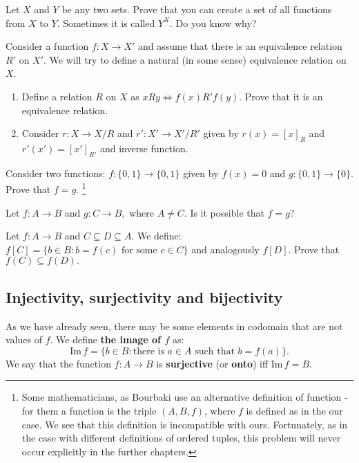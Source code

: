 \begin{exercise}
  Let $X$ and $Y$ be any two sets. Prove that you can create a set of all functions from $X$ to $Y$. Sometimes it is called $Y^X$. Do you know why?
\end{exercise}

\begin{exercise}
  Consider a function $f: X\to X'$ and assume that there is an equivalence relation $R'$ on $X'$. We will try to define a natural (in some sense) equivalence relation on $X$.
  \begin{enumerate}
    \item Define a relation $R$ on $X$ as $xRy\Leftrightarrow f(x) R' f(y)$. Prove that it is an equivalence relation.
    \item Consider $r: X\to X/R$ and $r': X'\to X'/R'$ given by $r(x)=[x]_R$ and $r'(x')=[x']_{R'}$ and inverse function.
  \end{enumerate}
\end{exercise}

\begin{prob}
	Consider two functions: $f:\{0, 1\}\to \{0,1\}$ given by $f(x)=0$ and $g:\{0,1\}\to\{0\}$.
	Prove that $f=g$.
	\footnote{Some mathematicians, as Bourbaki use an alternative definition of function - for them
	a function is the triple $(A,B,f)$, where $f$ is defined as in the our case. We see that this definition
	is incompatible with ours. Fortunately, as in the case with different definitions of ordered tuples,
	this problem will never occur explicitly in the further chapters.}
\end{prob}

\begin{prob}
	Let $f:A\to B$ and $g: C\to B,$ where $A\neq C$. Is it possible that $f=g$?
\end{prob}

\begin{prob}
	Let $f: A\to B$ and $C\subseteq D\subseteq A$. We define: $f[C] = \{b\in B : b=f(c) \text{ for some }c\in C \}$ and analogously $f[D]$. Prove that
	$f(C)\subseteq f(D).$
\end{prob}

\subsection{Injectivity, surjectivity and bijectivity}

\noindent As we have already seen, there may be some elements in codomain that are not values of
$f$. We define \textbf{the image of $f$} as:
$$\text{Im}\, f = \{b\in B : \text{there is } a\in A \text{ such that } b=f(a)\}.$$
We say that the function $f: A\to B$ is \textbf{surjective} (or \textbf{onto}) iff $\text{Im}\,f=B$.

